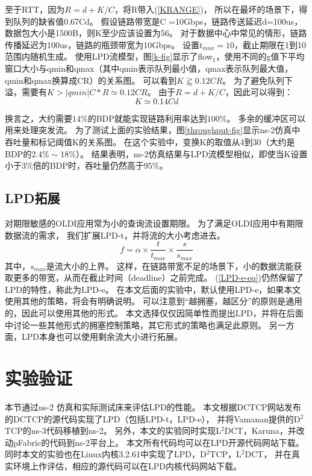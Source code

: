 至于RTT，因为$R = d + K / C$，将R带入(\ref{KRANGE})，
所以在最坏的场景下，得到队列的缺省值0.67Cd。 
假设链路带宽是C =10Gbps，链路传送延迟d=100us，数据包大小是1500B，则K至少应该设置为56。
对于数据中心中常见的情形，链路传播延迟为100us，链路的瓶颈带宽为10Gbps。
设置$t_{max} = 10$，截止期限在1到10范围内随机生成。
使用LPD流模型，图\ref{k-fig}显示了flow$_1$，使用不同的g值下平均窗口大小与qmin和qmax（其中qmin表示队列最小值，qmax表示队列最大值，qmin和qmax换算成CR）的关系图。
可以看到$K\gtrapprox0.12CR$。
为了避免队列下溢，需要有$K > |qmin |C*R \simeq0.12CR$。  
由于$R=d+K/C$，因此可以得到：
\begin{equation}
\label{KVALUE}
K \simeq 0.14 Cd
\end{equation}

换言之，大约需要$14\%$的BDP就能实现链路利用率达到$100\%$。 
多余的缓冲区可以用来处理突发流。
为了测试上面的实验结果，图\ref{throughput-fig}显示ns-2仿真中吞吐量和标记阈值K的关系图。 
在这个实验中，变换K的取值从4到30（大约是BDP的$2.4\% \sim18\%$）。 
结果表明，ns-2仿真结果与LPD流模型相似，即使当K设置小于$3\%$倍的BDP时，吞吐量仍然高于$95\%$。 


\subsection{LPD拓展}
对期限敏感的OLDI应用常为小的查询流设置期限。
为了满足OLDI应用中有期限数据流的需求，
我们扩展LPD-t，并将流的大小考虑进去。
\begin{equation}\label{LPD-e-eq}
f=\alpha \times \frac{t}{t_{max}} \times \frac{s}{s_{max}}
\end{equation}
其中，$s_{max}$是流大小的上界。
这样，在链路带宽不足的场景下，小的数据流能获取更多的带宽，从而在截止时间（deadline）之前完成。
 (\ref{LPD-e-eq})仍然保留了LPD的特性，称此为LPD-e。 
 在本文后面的实验中，默认使用LPD-e，如果本文使用其他的策略，将会有明确说明。
 可以注意到“越拥塞，越区分”的原则是通用的，因此可以使用其他的形式。
本文选择仅仅因简单性而提出LPD，并将在后面中讨论一些其他形式的拥塞控制策略，其它形式的策略也满足此原则。
 另一方面，LPD本身也可以使用剩余流大小进行拓展。
 
\section{实验验证}\label{LPDevaluation}
本节通过ns-2 \cite{ns2}仿真和实际测试床来评估LPD的性能。 
本文根据DCTCP网站\cite{DCTCPcode}发布的DCTCP的源代码实现了LPD（包括LPD-t，LPD-e），
并将Vamanan\cite{D2TCP}提供的D$^2$TCP的ns-3代码移植到ns-2。 
另外，本文的实验同时实现L$^2$DCT，Karuna，并改动pFabric的代码到ns-2平台上。 
本文所有代码均可以在LPD开源代码网站\cite{LPD-sim-code}下载。 
同时本文的实验也在Linux内核3.2.61中实现了LPD，D$^2$TCP，L$^2$DCT，
并在真实环境上作评估，相应的源代码可以在LPD内核代码网站\cite{LPD-code}下载。

